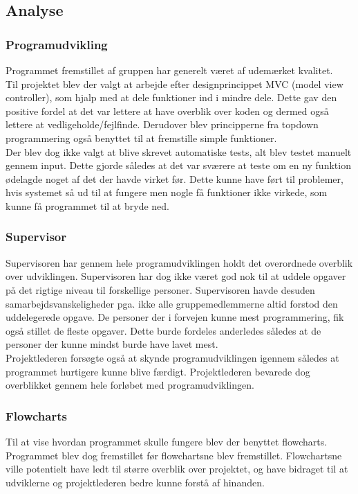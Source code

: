 \subsection{Analyse}
\subsubsection{Programudvikling}
Programmet fremstillet af gruppen har generelt været af udemærket kvalitet.\\

Til projektet blev der valgt at arbejde efter designprincippet MVC (model view controller), som hjalp med at dele funktioner ind i mindre dele. Dette gav den positive fordel at det var lettere at have overblik over koden og dermed også lettere at vedligeholde/fejlfinde. Derudover blev principperne fra topdown programmering også benyttet til at fremstille simple funktioner.\\

Der blev dog ikke valgt at blive skrevet automatiske tests, alt blev testet manuelt gennem input. Dette gjorde således at det var sværere at teste om en ny funktion ødelagde noget af det der havde virket før. Dette kunne have ført til problemer, hvis systemet så ud til at fungere men nogle få funktioner ikke virkede, som kunne få programmet til at bryde ned.\\

\subsubsection{Supervisor}
Supervisoren har gennem hele programudviklingen holdt det overordnede overblik over udviklingen. Supervisoren har dog ikke været god nok til at uddele opgaver på det rigtige niveau til forskellige personer. Supervisoren havde desuden samarbejdsvanskeligheder pga. ikke alle gruppemedlemmerne altid forstod den uddelegerede opgave. De personer der i forvejen kunne mest programmering, fik også stillet de fleste opgaver. Dette burde fordeles anderledes således at de personer der kunne mindst burde have lavet mest.\\

Projektlederen forsøgte også at skynde programudviklingen igennem således at programmet hurtigere kunne blive færdigt. Projektlederen bevarede dog overblikket gennem hele forløbet med programudviklingen.\\

\subsubsection{Flowcharts}
Til at vise hvordan programmet skulle fungere blev der benyttet flowcharts. Programmet blev dog fremstillet før flowchartsne blev fremstillet. Flowchartsne ville potentielt have ledt til større overblik over projektet, og have bidraget til at udviklerne og projektlederen bedre kunne forstå af hinanden.\\

